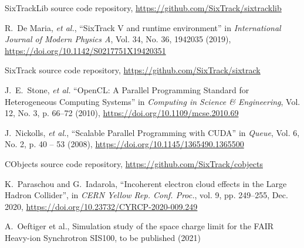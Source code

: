 \documentclass[a4paper,
               refpage,       %
               keeplastbox,   %
               ]{jacow}
\begin{document}

%
%
%
	{\printbibliography}%
	{%
	
	\begin{thebibliography}{99}   %
	
		SixTrackLib source code repository, \newline
		\url{https://github.com/SixTrack/sixtracklib}

        R.~De Maria,  {\it et al.}, ``SixTrack V and runtime environment'' in 
        \textit{International Journal of Modern Physics A}, Vol. 34, No. 36, 1942035 (2019), \newline
        \url{https://doi.org/10.1142/S0217751X19420351}

		SixTrack source code repository, \newline
		\url{https://github.com/SixTrack/sixtrack}
		
        J.~E.~Stone, {\it et al.} ``{OpenCL}: {{A Parallel Programming Standard}} for {{Heterogeneous Computing Systems}}'' in \textit{Computing in Science \& Engineering}, Vol. 12, No. 3, p. 66--72 (2010),  \newline
        \url{https://doi.org/10.1109/mcse.2010.69}
        
        J.~Nickolls, {\it et al.}, ``Scalable {{Parallel Programming}} with {{CUDA}}'' in 
        \textit{Queue}, Vol. 6, No. 2, p. 40 -- 53 (2008),  \newline
        \url{https://doi.org/10.1145/1365490.1365500}
        
        CObjects source code repository,  \newline
        \url{https://github.com/SixTrack/cobjects}
        
        K.~Paraschou and G.~Iadarola,
        ``Incoherent electron cloud effects in the Large Hadron Collider'', in
        \emph{CERN Yellow Rep. Conf. Proc.}, vol. 9, pp. 249--255, Dec. 2020, \newline
        \url{https://doi.org/10.23732/CYRCP-2020-009.249}
        
        A.~Oeftiger et al., Simulation study of the space charge limit for the FAIR Heavy-ion Synchrotron SIS100, to be published (2021)
        

\end{thebibliography}}
\end{document}
